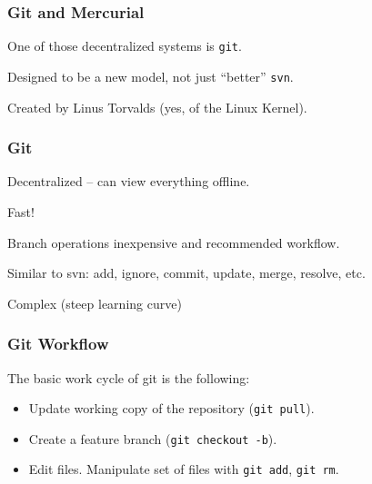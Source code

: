 \begin{frame}
\frametitle{Git and Mercurial}
\begin{changemargin}{1cm}
One of those decentralized systems is \texttt{git}.

Designed to be a new model, not just ``better'' \texttt{svn}.

Created by Linus Torvalds (yes, of the Linux Kernel).

\end{changemargin}
\end{frame}

\begin{frame}
\frametitle{Git}
\begin{changemargin}{1cm}
Decentralized -- can view everything offline.

Fast! 

Branch operations inexpensive and recommended workflow.

Similar to svn: add, ignore, commit, update, merge, resolve, etc.

Complex (steep learning curve)
\end{changemargin}
\end{frame}


\begin{frame}
\frametitle{Git Workflow}
\begin{changemargin}{1cm}
The basic work cycle of git is the following:
\begin{itemize}
\item Update working copy of the repository ({\tt git pull}).
\item Create a feature branch ({\tt git checkout -b}).
\item Edit files. Manipulate set of files with {\tt git add}, {\tt git rm}.
\end{itemize}

\end{changemargin}
\end{frame}


